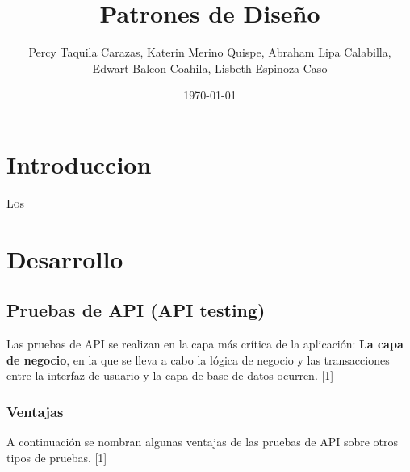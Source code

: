 \documentclass[twoside,twocolumn]{article}
\title{Patrones de Diseño}
\author{Percy Taquila Carazas, Katerin Merino Quispe, Abraham Lipa Calabilla,
\\Edwart Balcon Coahila, Lisbeth Espinoza Caso}
\date{\today}
\begin{document}
\maketitle


\section{Introduccion}

\lettrine[nindent=0em,lines=3]{L}os





\section{Desarrollo}

\subsection{Pruebas de API (API testing)}

Las pruebas de API se realizan en la capa más crítica de la aplicación: \textbf{La capa de negocio}, en la que se lleva a cabo la lógica de negocio y las transacciones entre la interfaz de usuario y la capa de base de datos ocurren. [1]

\subsubsection{Ventajas}

A continuación se nombran algunas ventajas de las pruebas de API sobre otros tipos de pruebas. [1]
\end{document}
